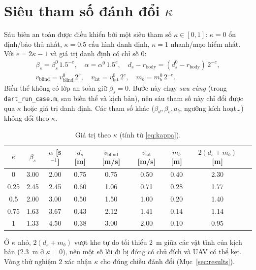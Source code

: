 \documentclass[11pt,a4paper]{article}
\numberwithin{equation}{section}
\newcommand{\code}[1]{\texttt{\small #1}}
\theoremstyle{definition}
\theoremstyle{plain}
\theoremstyle{remark}
\begin{document}
\section{Siêu tham số đánh đổi $\kappa$}
\label{sec:kappa}
Sáu biên an toàn được điều khiển bởi một siêu tham số $\kappa\in[0,1]$: $\kappa=0$ ổn định/bảo thủ nhất, $\kappa=0.5$ cấu hình danh định, $\kappa=1$ nhanh/mạo hiểm nhất. Với $e=2\kappa-1$ và giá trị danh định có chỉ số 0:
\begin{gather}
\beta_s=\beta_s^0\,1.5^{-e},\quad \alpha=\alpha^0\,1.5^{e},\quad d_s-r_{\text{body}}=(d_s^0-r_{\text{body}})\,2^{-e},\nonumber\\
v_{\text{blind}}=v_{\text{blind}}^0\,2^{e},\quad v_{\text{lat}}=v_{\text{lat}}^0\,2^{e},\quad m_b=m_b^0\,2^{-e}. \label{eq:kappa}
\end{gather}
Biến thể không có lớp an toàn giữ $\beta_s=0$. Bước này chạy \emph{sau cùng} (trong \code{dart\_run\_case.m}, sau biến thể và kịch bản), nên sáu tham số này chỉ đổi được qua $\kappa$ hoặc giá trị danh định. Các tham số khác ($\beta_d,\beta_v,a_b$, ngưỡng kích hoạt\ldots) không đổi theo $\kappa$.
\begin{table}[h]
\centering\small
\caption{Giá trị theo $\kappa$ (tính từ \eqref{eq:kappa}).}\label{tab:kappa}
\begin{tabular}{@{}ccccccccc@{}}
\toprule
$\kappa$ & $\beta_s$ & $\alpha$ [s$^{-1}$] & $d_s$ [m] & $v_{\text{blind}}$ [m/s] & $v_{\text{lat}}$ [m/s] & $m_b$ [m] & $2(d_s+m_b)$ [m] \\ \midrule
0 & 3.00 & 2.00 & 0.75 & 0.75 & 0.50 & 0.40 & 2.30 \\
0.25 & 2.45 & 2.45 & 0.60 & 1.06 & 0.71 & 0.28 & 1.77 \\
0.5 & 2.00 & 3.00 & 0.50 & 1.50 & 1.00 & 0.20 & 1.40 \\
0.75 & 1.63 & 3.67 & 0.43 & 2.12 & 1.41 & 0.14 & 1.14 \\
1 & 1.33 & 4.50 & 0.38 & 3.00 & 2.00 & 0.10 & 0.95 \\
\bottomrule
\end{tabular}
\end{table}
Ở $\kappa$ nhỏ, $2(d_s+m_b)$ vượt khe tự do tối thiểu 2~m giữa các vật tĩnh của kịch bản (2.3~m ở $\kappa=0$), nên một số lối đi bị đóng có chủ đích và UAV có thể kẹt. Vòng thử nghiệm 2 xác nhận $\kappa$ cho đúng chiều đánh đổi (Mục~\ref{sec:results}).

\end{document}
